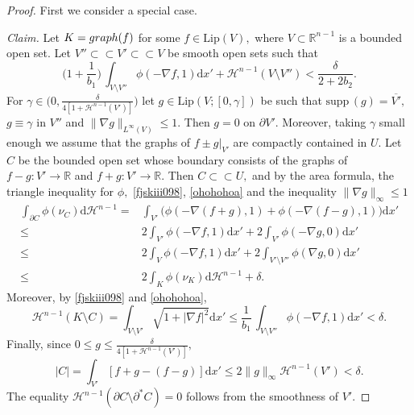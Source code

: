 \documentclass[reqno]{amsart}
\numberwithin{equation}{section}
\theoremstyle{plain}
\theoremstyle{definition}
\newcommand{\R}{\mathbb{R}}
\newcommand{\cH}{\mathcal{H}}
\newcommand{\p}{\partial}
\newcommand{\cl}[1]{\overline{#1}}
\newcommand{\bound}{b}
\renewcommand{\d}{\mathrm{d}}
\newcommand{\strictlyincluded}{\subset\subset}
\newcommand{\supp}{\mathrm{supp}\,}
\newcommand{\Lip}{\mathrm{Lip}}
\begin{document}
\begin{proof}
First we consider a special case.

{\it Claim.} Let $K={\rm graph}(f)$ for some $f\in \Lip(V),$ where $V\subset\R^{n-1}$ is a bounded open set. Let $V''\strictlyincluded V'\strictlyincluded V$ be smooth open sets such that 
\begin{equation}
\Big(1 + \frac{1}{\bound_1}\Big)\,\int_{V\setminus V''} \phi(-\nabla f,1)\d x' + \cH^{n-1}(V\setminus V'') < \frac{\delta }{2 + 2\bound_2}. 
\label{ohohohoa} 
\end{equation}
%
For $\gamma\in\big(0,\frac{\delta }{4[1 + \cH^{n-1}(V')]}\big)$ let $g\in \Lip(V;[0,\gamma])$ be such that $\supp(g)=\cl{V'},$  $g\equiv \gamma$ in $V''$ and $\|\nabla g\|_{L^\infty(V)}\le 1.$ Then $g=0$ on $\p V'.$ Moreover, taking $\gamma$ small enough we assume that the graphs of $f\pm g\big|_{V'}$ are compactly contained in $U.$ Let $C$ be the bounded  open set whose boundary consists of the graphs of $f-g:V'\to\R$ and $f+g:V'\to\R.$ Then $C\strictlyincluded U,$
and by the area formula, the triangle inequality for $\phi,$ \eqref{fjskiii098}, \eqref{ohohohoa} and the inequality $\|\nabla g\|_\infty\le1$
$$
\begin{aligned}
\int_{\p C} \phi(\nu_C)\d\cH^{n-1}= &\int_{V'} \Big(\phi(-\nabla(f+g),1) + \phi(-\nabla (f-g),1) \Big)\d x'\\
\le & 2\int_{V'} \phi(-\nabla f,1)\d x' + 2\int_{V'} \phi(-\nabla g,0)\d x'\\
\le & 2\int_{V} \phi(-\nabla f,1)\d x'+  2\int_{V'\setminus V''} \phi(\nabla g,0)\d x'\\
\le & 2\int_K \phi(\nu_K)\d\cH^{n-1} + \delta .
\end{aligned} 
$$
Moreover, by \eqref{fjskiii098} and \eqref{ohohohoa},
$$
\cH^{n-1}(K\setminus C) = \int_{V\setminus V'} \sqrt{1 + |\nabla f|^2}\d x' \le \frac{1}{\bound_1}\,\int_{V\setminus V''} \phi(-\nabla f,1)\d x'< \delta . 
$$
Finally, since $0\le g\le \frac{\delta }{4[1+\cH^{n-1}(V')]},$
$$
|C| =\int_{V'} [f+g - (f-g)]\d x' \le 2\|g\|_\infty\cH^{n-1}(V') <\delta .
$$
The equality 
$\cH^{n-1}(\p C\setminus \p^*C)=0$ follows from the smoothness of $V'$.



\end{proof}
\end{document}
